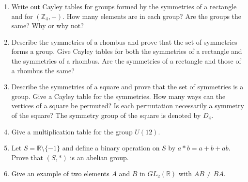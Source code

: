 {\begin{enumerate}
\begin{multicols}{2}
\begin{enumerate}
 
 
\item
\[
\begin{array}{c|cccc}
\circ & a & b & c & d \\
\hline
a & a & b & c & d \\
b & b & c & d & a \\
c & c & d & a & b \\
d & d & a & b & c
\end{array}
\]

\item
\[
\begin{array}{c|cccc}
\circ & a & b & c & d \\
\hline
a & a & b & c & d \\
b & b & a & c & d \\
c & c & b & a & d \\
d & d & d & b & c
\end{array}
\]
\end{enumerate}
\end{multicols}
 
\item   %
Write out Cayley tables for groups formed by the symmetries of a
rectangle and for $({\mathbb Z}_4, +)$. How many elements are in each
group? Are the groups the same? Why or why not? 
 
 
\item %
Describe the symmetries of a rhombus and prove that the set of
symmetries forms a group. Give Cayley tables for both the symmetries
of a rectangle and the symmetries of a rhombus. Are the symmetries of
a rectangle and those of a rhombus the same?
 
 
\item %
Describe the symmetries of a square and prove that the set of
symmetries is a group. Give a Cayley table for the symmetries. How
many ways can the vertices of a square be permuted?  Is each
permutation necessarily a symmetry of the square?  The symmetry group
of the square is denoted by $D_4$.
 
 
\item
Give a multiplication table for the group $U(12)$.
 
 
\item
Let $S = {\mathbb R} \setminus \{ -1 \}$ and define a binary operation on
$S$ by $a \ast b = a + b +ab$. Prove that $(S, \ast)$ is an abelian
group.
 
 
\item
Give an example of two elements $A$ and $B$ in $GL_2({\mathbb R})$ with
$AB \neq BA$.
 

\end{enumerate}}
